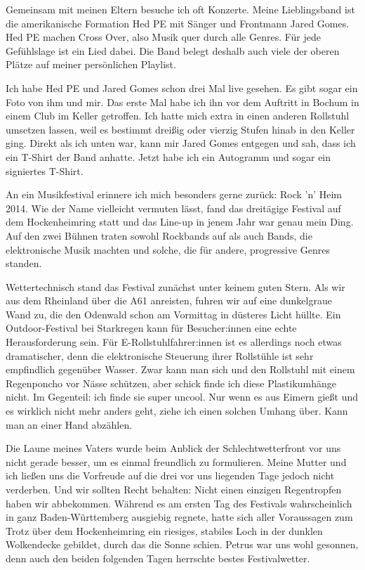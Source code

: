 \documentclass[fontsize=14pt,a4paper,headinclude,DIV=calc,automark]{scrbook}
\begin{document}
Gemeinsam mit meinen Eltern besuche ich oft Konzerte. Meine Lieblingsband ist die amerikanische Formation Hed PE mit Sänger und Frontmann Jared Gomes. Hed PE machen Cross Over, also Musik quer durch alle Genres. Für jede Gefühlslage ist ein Lied dabei. Die Band belegt deshalb auch viele der oberen Plätze auf meiner persönlichen Playlist.

Ich habe Hed PE und Jared Gomes schon drei Mal live gesehen. Es gibt sogar ein Foto von ihm und mir. Das erste Mal habe ich ihn vor dem Auftritt in Bochum in einem Club im Keller getroffen. Ich hatte mich extra in einen anderen Rollstuhl umsetzen lassen, weil es bestimmt dreißig oder vierzig Stufen hinab in den Keller ging. Direkt als ich unten war, kann mir Jared Gomes entgegen und sah, dass ich ein T-Shirt der Band anhatte. Jetzt habe ich ein Autogramm und sogar ein signiertes T-Shirt.

An ein Musikfestival erinnere ich mich besonders gerne zurück: Rock 'n' Heim 2014. Wie der Name vielleicht vermuten lässt, fand das dreitägige Festival auf dem Hockenheimring statt und das Line-up in jenem Jahr war genau mein Ding. Auf den zwei Bühnen traten sowohl Rockbands auf als auch Bands, die elektronische Musik machten und solche, die für andere, progressive Genres standen.

Wettertechnisch stand das Festival zunächst unter keinem guten Stern. Als wir aus dem Rheinland über die A61 anreisten, fuhren wir auf eine dunkelgraue Wand zu, die den Odenwald schon am Vormittag in düsteres Licht hüllte. Ein Outdoor-Festival bei Starkregen kann für Besucher:innen eine echte Herausforderung sein. Für E-Rollstuhlfahrer:innen ist es allerdings noch etwas dramatischer, denn die elektronische Steuerung ihrer Rollstühle ist sehr empfindlich gegenüber Wasser. Zwar kann man sich und den Rollstuhl mit einem Regenponcho vor Nässe schützen, aber schick finde ich diese Plastikumhänge nicht. Im Gegenteil: ich finde sie super uncool. Nur wenn es aus Eimern gießt und es wirklich nicht mehr anders geht, ziehe ich einen solchen Umhang über. Kann man an einer Hand abzählen.

Die Laune meines Vaters wurde beim Anblick der Schlechtwetterfront vor uns nicht gerade besser, um es einmal freundlich zu formulieren. Meine Mutter und ich ließen uns die Vorfreude auf die drei vor uns liegenden Tage jedoch nicht verderben. Und wir sollten Recht behalten: Nicht einen einzigen Regentropfen haben wir abbekommen. Während es am ersten Tag des Festivals wahrscheinlich in ganz Baden-Württemberg ausgiebig regnete, hatte sich aller Voraussagen zum Trotz über dem Hockenheimring ein riesiges, stabiles Loch in der dunklen Wolkendecke gebildet, durch das die Sonne schien. Petrus war uns wohl gesonnen, denn auch den beiden folgenden Tagen herrschte bestes Festivalwetter.
\end{document}
